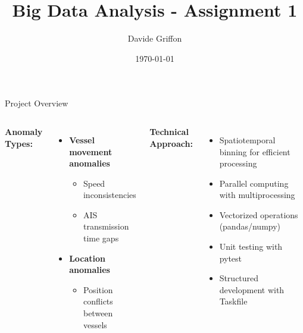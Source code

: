\documentclass[svgnames, 12pt]{beamer}
\title{Big Data Analysis - Assignment 1}
\author{Davide Griffon}
\institute{Vilnius University}
\date{\today}
\begin{document}
\begin{frame}
\titlepage
\end{frame}

\begin{frame}{Project Overview}
    \begin{columns}[T] %
    \textbf{Anomaly Types:}
    \begin{itemize}
        \item \textbf{Vessel movement anomalies}
        \begin{itemize}
            \item Speed inconsistencies
            \item AIS transmission time gaps
        \end{itemize}
        \item \textbf{Location anomalies}
        \begin{itemize}
            \item Position conflicts between vessels
        \end{itemize}
    \end{itemize}
    
    \textbf{Technical Approach:}
    \begin{itemize}
        \item Spatiotemporal binning for efficient processing
        \item Parallel computing with multiprocessing
        \item Vectorized operations (pandas/numpy)
        \item Unit testing with pytest
        \item Structured development with Taskfile
    \end{itemize}
    \end{columns}
\end{frame}
\end{document}
